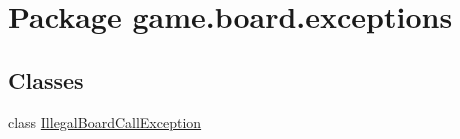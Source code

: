 \hypertarget{namespacegame_1_1board_1_1exceptions}{}\section{Package game.\+board.\+exceptions}
\label{namespacegame_1_1board_1_1exceptions}
\subsection*{Classes}
\begin{DoxyCompactItemize}
\item 
class \mbox{\hyperlink{classgame_1_1board_1_1exceptions_1_1_illegal_board_call_exception}{Illegal\+Board\+Call\+Exception}}
\end{DoxyCompactItemize}
